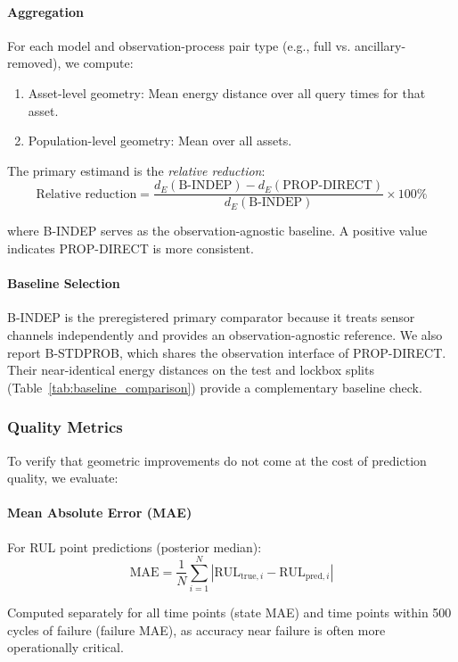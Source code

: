 \paragraph{Aggregation}
For each model and observation-process pair type (e.g., full vs. ancillary-removed), we compute:
\begin{enumerate}
    \item Asset-level geometry: Mean energy distance over all query times for that asset.
    \item Population-level geometry: Mean over all assets.
\end{enumerate}

The primary estimand is the \emph{relative reduction}:
\[
\text{Relative reduction} = \frac{d_E(\text{B-INDEP}) - d_E(\text{PROP-DIRECT})}{d_E(\text{B-INDEP})} \times 100\%
\]

where B-INDEP serves as the observation-agnostic baseline. A positive value indicates PROP-DIRECT is more consistent.

\paragraph{Baseline Selection}
B-INDEP is the preregistered primary comparator because it treats sensor
channels independently and provides an observation-agnostic reference. We also
report B-STDPROB, which shares the observation interface of PROP-DIRECT. Their
near-identical energy distances on the test and lockbox splits
(Table~\ref{tab:baseline_comparison}) provide a complementary baseline check.

\subsubsection{Quality Metrics}

To verify that geometric improvements do not come at the cost of prediction quality, we evaluate:

\paragraph{Mean Absolute Error (MAE)}
For RUL point predictions (posterior median):
\[
\text{MAE} = \frac{1}{N} \sum_{i=1}^{N} |\text{RUL}_{\text{true},i} - \text{RUL}_{\text{pred},i}|
\]

Computed separately for all time points (state MAE) and time points within 500 cycles of failure (failure MAE), as accuracy near failure is often more operationally critical.

